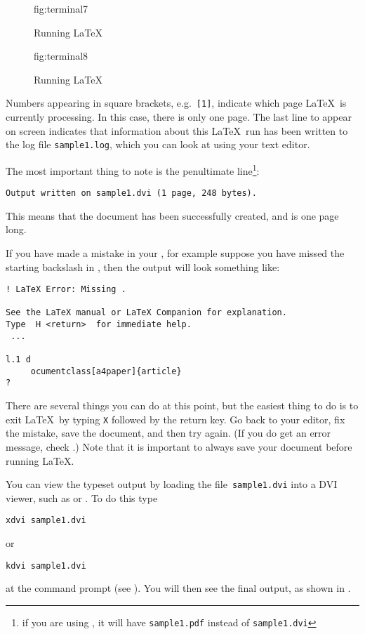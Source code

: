 \begin{figure}[htbp]
  {\caption{Running \LaTeX}}
  {fig:terminal7}
\end{figure}

\begin{figure}[htbp]
  {\caption{Running \LaTeX}}
  {fig:terminal8}
\end{figure}

\label{obj:transcript}
Numbers appearing in square brackets, e.g.\ \texttt{[1]}, indicate
which page \LaTeX\ is currently processing.  In this case, there is
only one page.  The last line to appear on screen
indicates that information about this \LaTeX\ run has been written
to the log file \texttt{sample1.log}, which you can look at using 
your text editor.

The most important thing to note is the penultimate line\footnote{if
you are using \PDFLaTeX, it will have \texttt{sample1.pdf} instead of
\texttt{sample1.dvi}}:
\begin{verbatim}
Output written on sample1.dvi (1 page, 248 bytes).
\end{verbatim}
This means that the document has been successfully created, and
is one page long.

If you have made a mistake in your ,
for example suppose you have missed the starting backslash in
, then the output will look something like:
\begin{verbatim}
! LaTeX Error: Missing .

See the LaTeX manual or LaTeX Companion for explanation.
Type  H <return>  for immediate help.
 ...

l.1 d
     ocumentclass[a4paper]{article}
?
\end{verbatim}
There are several things you can do at this point, but the easiest
thing to do is to exit \LaTeX\ by typing \texttt{X} followed by the
return key. Go back to your editor, fix the mistake, save the
document, and then try again. (If you do get an error message, check
.) Note that it is important to always save your
document before running \LaTeX.

\label{obj:xdvi}
You can view the typeset output by loading the file\indexDVI\  
\texttt{sample1.dvi} into a DVI viewer, such as 
or . To do this type
\begin{verbatim}
xdvi sample1.dvi
\end{verbatim}
or
\begin{verbatim}
kdvi sample1.dvi
\end{verbatim}
at the command prompt (see
). You will then see the final output,
as shown in .

